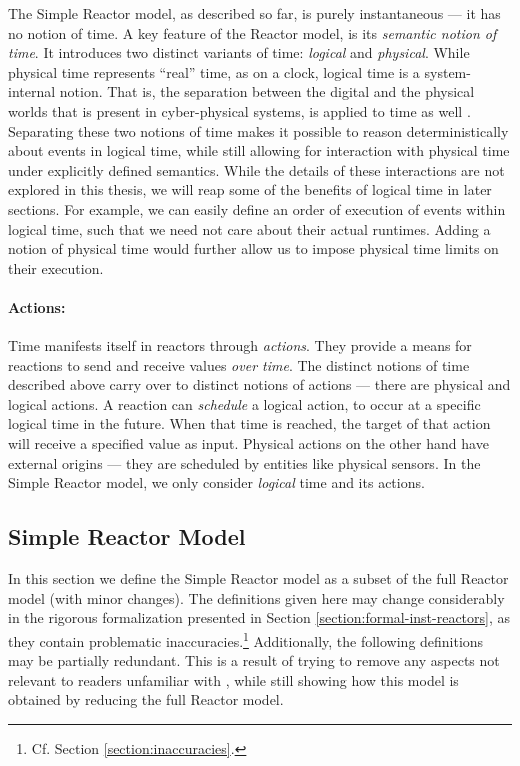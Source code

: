 The Simple Reactor model, as described so far, is purely instantaneous --- it has no notion of time. 
A key feature of the Reactor model, is its \emph{semantic notion of time}.
It introduces two distinct variants of time: \emph{logical} and \emph{physical}. 
While physical time represents ``real'' time, as on a clock, logical time is a system-internal notion.
That is, the separation between the digital and the physical worlds that is present in cyber-physical systems, is applied to time as well \cite[p.~235]{dense}.
Separating these two notions of time makes it possible to reason deterministically about events in logical time, while still allowing for interaction with physical time under explicitly defined semantics.
While the details of these interactions are not explored in this thesis, we will reap some of the benefits of logical time in later sections.
For example, we can easily define an order of execution of events within logical time, such that we need not care about their actual runtimes.
Adding a notion of physical time would further allow us to impose physical time limits on their execution.

\paragraph{Actions:}

Time manifests itself in reactors through \emph{actions}.
They provide a means for reactions to send and receive values \emph{over time}. 
The distinct notions of time described above carry over to distinct notions of actions --- there are physical and logical actions. 
A reaction can \emph{schedule} a logical action, to occur at a specific logical time in the future. 
When that time is reached, the target of that action will receive a specified value as input.
Physical actions on the other hand have external origins --- they are scheduled by entities like physical sensors.
In the Simple Reactor model, we only consider \emph{logical} time and its actions.

\subsection{Simple Reactor Model}
\label{section:simpel-reactors}

In this section we define the Simple Reactor model as a subset of the full Reactor model (with minor changes).
The definitions given here may change considerably in the rigorous formalization presented in Section \ref{section:formal-inst-reactors}, as they contain problematic inaccuracies.\footnote{Cf. Section \ref{section:inaccuracies}.}
Additionally, the following definitions may be partially redundant. 
This is a result of trying to remove any aspects not relevant to readers unfamiliar with \cite{cyphy}, while still showing how this model is obtained by reducing the full Reactor model.

